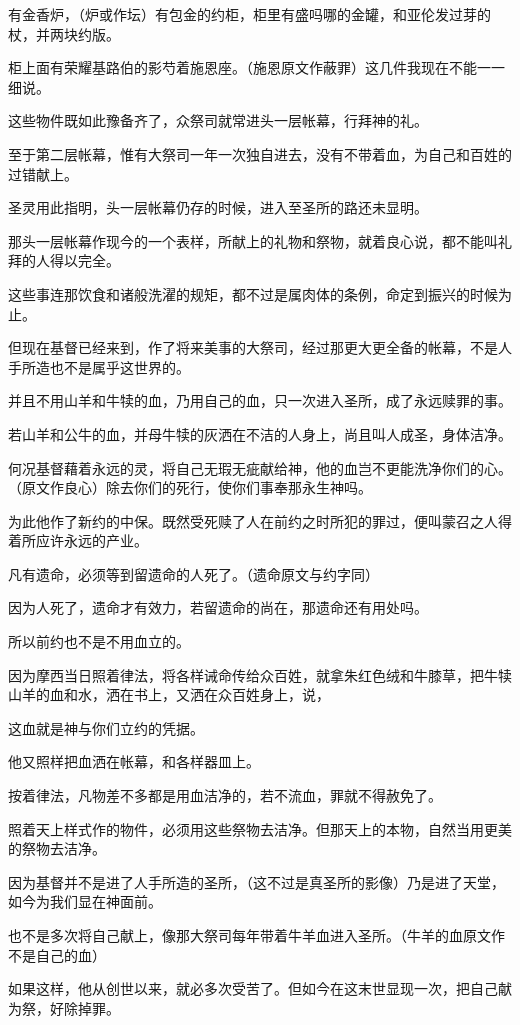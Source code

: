 \documentclass[12pt,oneside]{book}
\begin{document}
有金香炉，（炉或作坛）有包金的约柜，柜里有盛吗哪的金罐，和亚伦发过芽的杖，并两块约版。

柜上面有荣耀基路伯的影芍着施恩座。（施恩原文作蔽罪）这几件我现在不能一一细说。

这些物件既如此豫备齐了，众祭司就常进头一层帐幕，行拜神的礼。

至于第二层帐幕，惟有大祭司一年一次独自进去，没有不带着血，为自己和百姓的过错献上。

圣灵用此指明，头一层帐幕仍存的时候，进入至圣所的路还未显明。

那头一层帐幕作现今的一个表样，所献上的礼物和祭物，就着良心说，都不能叫礼拜的人得以完全。

这些事连那饮食和诸般洗濯的规矩，都不过是属肉体的条例，命定到振兴的时候为止。

但现在基督已经来到，作了将来美事的大祭司，经过那更大更全备的帐幕，不是人手所造也不是属乎这世界的。

并且不用山羊和牛犊的血，乃用自己的血，只一次进入圣所，成了永远赎罪的事。

若山羊和公牛的血，并母牛犊的灰洒在不洁的人身上，尚且叫人成圣，身体洁净。

何况基督藉着永远的灵，将自己无瑕无疵献给神，他的血岂不更能洗净你们的心。（原文作良心）除去你们的死行，使你们事奉那永生神吗。

为此他作了新约的中保。既然受死赎了人在前约之时所犯的罪过，便叫蒙召之人得着所应许永远的产业。

凡有遗命，必须等到留遗命的人死了。（遗命原文与约字同）

因为人死了，遗命才有效力，若留遗命的尚在，那遗命还有用处吗。

所以前约也不是不用血立的。

因为摩西当日照着律法，将各样诫命传给众百姓，就拿朱红色绒和牛膝草，把牛犊山羊的血和水，洒在书上，又洒在众百姓身上，说，

这血就是神与你们立约的凭据。

他又照样把血洒在帐幕，和各样器皿上。

按着律法，凡物差不多都是用血洁净的，若不流血，罪就不得赦免了。

照着天上样式作的物件，必须用这些祭物去洁净。但那天上的本物，自然当用更美的祭物去洁净。

因为基督并不是进了人手所造的圣所，（这不过是真圣所的影像）乃是进了天堂，如今为我们显在神面前。

也不是多次将自己献上，像那大祭司每年带着牛羊血进入圣所。（牛羊的血原文作不是自己的血）

如果这样，他从创世以来，就必多次受苦了。但如今在这末世显现一次，把自己献为祭，好除掉罪。
\end{document}

